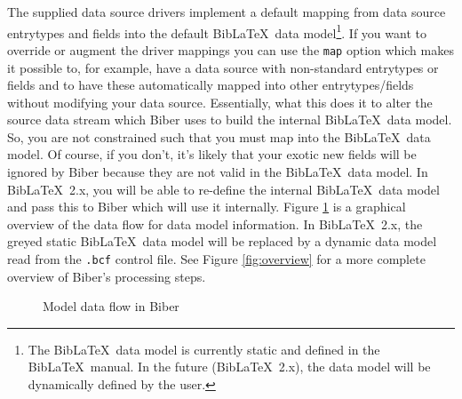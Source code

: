 \documentclass{ltxdockit}
\begin{document}
The supplied data source drivers implement a default mapping from data
source entrytypes and fields into the default Bib\LaTeX\ data
model\footnote{The Bib\LaTeX\ data model is currently static and
  defined in the Bib\LaTeX\ manual. In the future (Bib\LaTeX\
  2.x), the data model will be dynamically defined by the user.}. If you
want to override or augment the driver mappings you can use the \verb+map+
option which makes it possible to, for example, have a data source with
non-standard entrytypes or fields and to have these automatically mapped
into other entrytypes/fields without modifying your data source.
Essentially, what this does it to alter the source data stream which
Biber uses to build the internal Bib\LaTeX\ data model. So, you
are not constrained such that you must map into the Bib\LaTeX\ data
model. Of course, if you don't, it's likely that your exotic new fields
will be ignored by Biber because they are not valid in the
Bib\LaTeX\ data model. In Bib\LaTeX\ 2.x, you will be able to
re-define the internal Bib\LaTeX\ data model and pass this to
Biber which will use it internally. Figure \ref{fig:biber-mdf} is a
graphical overview of the data flow for data model information. In
Bib\LaTeX\ 2.x, the greyed static Bib\LaTeX\ data model will be
replaced by a dynamic data model read from the \verb+.bcf+ control file.
See Figure \ref{fig:overview} for a more complete overview of
Biber's processing steps.

\begin{figure}[!htpb]
  \centering\small
  \caption{Model data flow in Biber}
  \label{fig:biber-mdf}
\end{figure}
\end{document}
